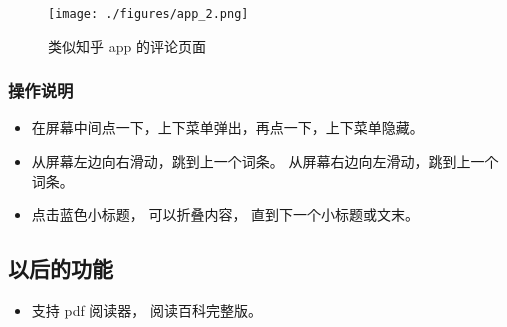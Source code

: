 \begin{figure}[ht]
\centering
\texttt{[image: ./figures/app\_2.png]}
\caption{类似知乎 app 的评论页面} \label{app_fig2}
\end{figure}

\subsubsection{操作说明}
\begin{itemize}
\item 在屏幕中间点一下，上下菜单弹出，再点一下，上下菜单隐藏。
\item 从屏幕左边向右滑动，跳到上一个词条。 从屏幕右边向左滑动，跳到上一个词条。
\item 点击蓝色小标题， 可以折叠内容， 直到下一个小标题或文末。
\end{itemize}

\subsection{以后的功能}
\begin{itemize}
\item 支持 pdf 阅读器， 阅读百科完整版。
\end{itemize}
